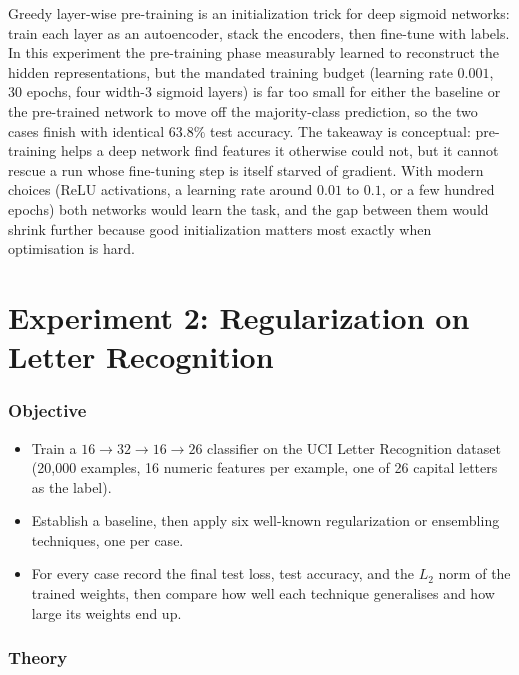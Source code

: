 \documentclass[12pt]{article}
\begin{document}
Greedy layer-wise pre-training is an initialization trick for deep sigmoid
networks: train each layer as an autoencoder, stack the encoders, then
fine-tune with labels. In this experiment the pre-training phase measurably
learned to reconstruct the hidden representations, but the mandated training
budget (learning rate $0.001$, 30 epochs, four width-3 sigmoid layers) is far
too small for either the baseline or the pre-trained network to move off the
majority-class prediction, so the two cases finish with identical
$63.8\%$ test accuracy. The takeaway is conceptual: pre-training helps a deep
network find features it otherwise could not, but it cannot rescue a run whose
fine-tuning step is itself starved of gradient. With modern choices (ReLU
activations, a learning rate around $0.01$ to $0.1$, or a few hundred epochs)
both networks would learn the task, and the gap between them would shrink
further because good initialization matters most exactly when optimisation is
hard.


\newpage
\part*{Experiment 2: Regularization on Letter Recognition}

\section{Objective}

\begin{itemize}
\item Train a $16 \rightarrow 32 \rightarrow 16 \rightarrow 26$ classifier on the
      UCI Letter Recognition dataset (20{,}000 examples, 16 numeric features per
      example, one of 26 capital letters as the label).
\item Establish a baseline, then apply six well-known regularization or
      ensembling techniques, one per case.
\item For every case record the final test loss, test accuracy, and the
      $L_2$ norm of the trained weights, then compare how well each technique
      generalises and how large its weights end up.
\end{itemize}

\section{Theory}
\end{document}
